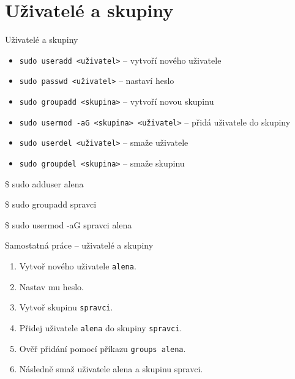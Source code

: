 \documentclass{beamer}
\begin{document}
\section{Uživatelé a skupiny}
\begin{frame}{Uživatelé a skupiny}
	\begin{itemize}
		\item \texttt{sudo useradd <uživatel>} – vytvoří nového uživatele
		\item \texttt{sudo passwd <uživatel>} – nastaví heslo
		\item \texttt{sudo groupadd <skupina>} – vytvoří novou skupinu
		\item \texttt{sudo usermod -aG <skupina> <uživatel>} – přidá uživatele do skupiny
		\item \texttt{sudo userdel <uživatel>} – smaže uživatele
		\item \texttt{sudo groupdel <skupina>} – smaže skupinu
	\end{itemize}
	
	\begin{semiverbatim}
		\$ sudo adduser alena
		
		\$ sudo groupadd spravci
		
		\$ sudo usermod -aG spravci alena
	\end{semiverbatim}
\end{frame}


\begin{frame}{Samostatná práce – uživatelé a skupiny}
	\small
	\begin{enumerate}
		\item Vytvoř nového uživatele \texttt{alena}.
		\item Nastav mu heslo.
		\item Vytvoř skupinu \texttt{spravci}.
		\item Přidej uživatele \texttt{alena} do skupiny \texttt{spravci}.
		\item Ověř přidání pomocí příkazu \texttt{groups alena}.
		\item Následně smaž uživatele alena a skupinu spravci.
	\end{enumerate}
\end{frame}
\end{document}
